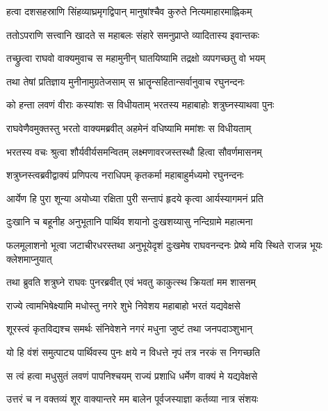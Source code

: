 \twolineshloka
{हत्वा दशसहस्राणि सिंहव्याघ्रमृगद्विपान्}
{मानुषांश्चैव कुरुते नित्यमाहारमाह्निकम्} %

\twolineshloka
{ततोऽपराणि सत्त्वानि खादते स महाबलः}
{संहारे समनुप्राप्ते व्यादितास्य इवान्तकः} %

\twolineshloka
{तच्छ्रुत्वा राघवो वाक्यमुवाच स महामुनीन्}
{घातयिष्यामि तद्रक्षो व्यपगच्छतु वो भयम्} %

\twolineshloka
{तथा तेषां प्रतिज्ञाय मुनीनामुग्रतेजसाम्}
{स भ्रातॄन्सहितान्सर्वानुवाच रघुनन्दनः} %

\twolineshloka
{को हन्ता लवणं वीराः कस्यांशः स विधीयताम्}
{भरतस्य महाबाहोः शत्रुघ्नस्याथवा पुनः} %

\twolineshloka
{राघवेणैवमुक्तस्तु भरतो वाक्यमब्रवीत्}
{अहमेनं वधिष्यामि ममांशः स विधीयताम्} %

\twolineshloka
{भरतस्य वचः श्रुत्वा शौर्यवीर्यसमन्वितम्}
{लक्ष्मणावरजस्तस्थौ हित्वा सौवर्णमासनम्} %

\twolineshloka
{शत्रुघ्नस्त्वब्रवीद्वाक्यं प्रणिपत्य नराधिपम्}
{कृतकर्मा महाबाहुर्मध्यमो रघुनन्दनः} %

\twolineshloka
{आर्येण हि पुरा शून्या अयोध्या रक्षिता पुरी}
{सन्तापं हृदये कृत्वा आर्यस्यागमनं प्रति} %

\twolineshloka
{दुःखानि च बहूनीह अनुभूतानि पार्थिव}
{शयानो दुःखशय्यासु नन्दिग्रामे महात्मना} %

\threelineshloka
{फलमूलाशनो भूत्वा जटाचीरधरस्तथा}
{अनुभूयेदृशं दुःखमेष राघवनन्दनः}
{प्रेष्ये मयि स्थिते राजन्न भूयः क्लेशमाप्नुयात्} %

\twolineshloka
{तथा ब्रुवति शत्रुघ्ने राघवः पुनरब्रवीत्}
{एवं भवतु काकुत्स्थ क्रियतां मम शासनम्} %

\twolineshloka
{राज्ये त्वामभिषेक्ष्यामि मधोस्तु नगरे शुभे}
{निवेशय महाबाहो भरतं यद्यवेक्षसे} %

\twolineshloka
{शूरस्त्वं कृतविद्यश्च समर्थः संनिवेशने}
{नगरं मधुना जुष्टं तथा जनपदाञ्शुभान्} %

\twolineshloka
{यो हि वंशं समुत्पाट्य पार्थिवस्य पुनः क्षये}
{न विधत्ते नृपं तत्र नरकं स निगच्छति} %

\twolineshloka
{स त्वं हत्वा मधुसुतं लवणं पापनिश्चयम्}
{राज्यं प्रशाधि धर्मेण वाक्यं मे यद्यवेक्षसे} %

\twolineshloka
{उत्तरं च न वक्तव्यं शूर वाक्यान्तरे मम}
{बालेन पूर्वजस्याज्ञा कर्तव्या नात्र संशयः} %

